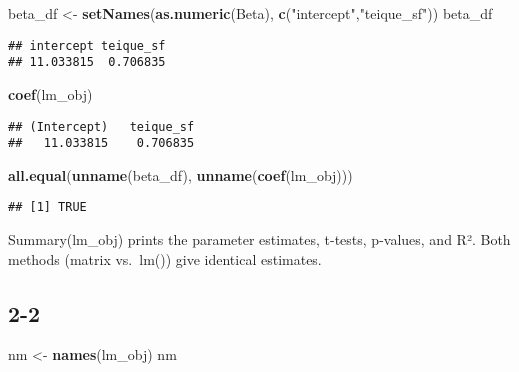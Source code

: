 \documentclass[
]{article}
\newenvironment{Shaded}{\begin{snugshade}}{\end{snugshade}}
\newcommand{\FunctionTok}[1]{\textcolor[rgb]{0.13,0.29,0.53}{\textbf{#1}}}
\newcommand{\NormalTok}[1]{#1}
\newcommand{\OtherTok}[1]{\textcolor[rgb]{0.56,0.35,0.01}{#1}}
\newcommand{\StringTok}[1]{\textcolor[rgb]{0.31,0.60,0.02}{#1}}
\begin{document}
\begin{Shaded}
\begin{Highlighting}[]
\NormalTok{beta\_df }\OtherTok{\textless{}{-}} \FunctionTok{setNames}\NormalTok{(}\FunctionTok{as.numeric}\NormalTok{(Beta), }\FunctionTok{c}\NormalTok{(}\StringTok{"intercept"}\NormalTok{,}\StringTok{"teique\_sf"}\NormalTok{))}
\NormalTok{beta\_df}
\end{Highlighting}
\end{Shaded}

\begin{verbatim}
## intercept teique_sf 
## 11.033815  0.706835
\end{verbatim}

\begin{Shaded}
\begin{Highlighting}[]
\FunctionTok{coef}\NormalTok{(lm\_obj)}
\end{Highlighting}
\end{Shaded}

\begin{verbatim}
## (Intercept)   teique_sf 
##   11.033815    0.706835
\end{verbatim}

\begin{Shaded}
\begin{Highlighting}[]
\FunctionTok{all.equal}\NormalTok{(}\FunctionTok{unname}\NormalTok{(beta\_df), }\FunctionTok{unname}\NormalTok{(}\FunctionTok{coef}\NormalTok{(lm\_obj)))}
\end{Highlighting}
\end{Shaded}

\begin{verbatim}
## [1] TRUE
\end{verbatim}

Summary(lm\_obj) prints the parameter estimates, t-tests, p-values, and
R². Both methods (matrix vs.~lm()) give identical estimates.

\subsection{2-2}\label{section-5}

\begin{Shaded}
\begin{Highlighting}[]
\NormalTok{nm }\OtherTok{\textless{}{-}} \FunctionTok{names}\NormalTok{(lm\_obj)}
\NormalTok{nm}
\end{Highlighting}
\end{Shaded}
\end{document}
